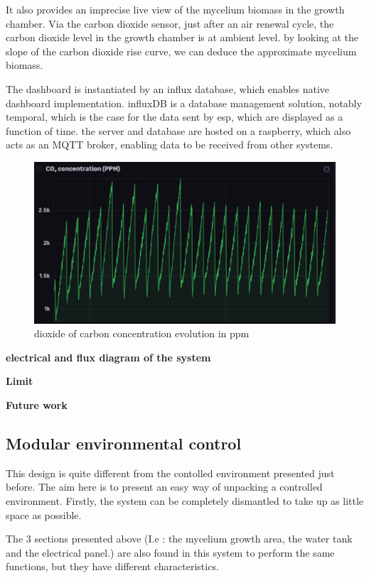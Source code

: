 It also provides an imprecise live view of the mycelium biomass in the growth chamber.
Via the carbon dioxide sensor, just after an air renewal cycle, the carbon dioxide level in the growth chamber is at ambient level. by looking at the slope of the carbon dioxide rise curve, we can deduce the approximate mycelium biomass. 

The dashboard is instantiated by an influx database, which enables native dashboard implementation. influxDB is a database management solution, notably temporal, which is the case for the data sent by esp, which are displayed as a function of time. 
the server and database are hosted on a raspberry, which also acts as an MQTT broker, enabling data to be received from other systems. 

\begin{figure}[h]
    \centering
    \includegraphics{images/CO2dashboard.png}
    \caption{dioxide of carbon concentration evolution in ppm}
    \label{fig:}
\end{figure} 


\textbf{electrical and flux diagram of the system }

\textbf{Limit}



\textbf{Future work}

\subsection{Modular environmental control}

This design is quite different from the contolled environment presented just before. 
The aim here is to present an easy way of unpacking a controlled environment. Firstly, the system can be completely dismantled to take up as little space as possible. 

The 3 sections presented above (I.e : the mycelium growth area, the water tank and the electrical panel.) are also found in this system to perform the same functions, but they have different characteristics.

